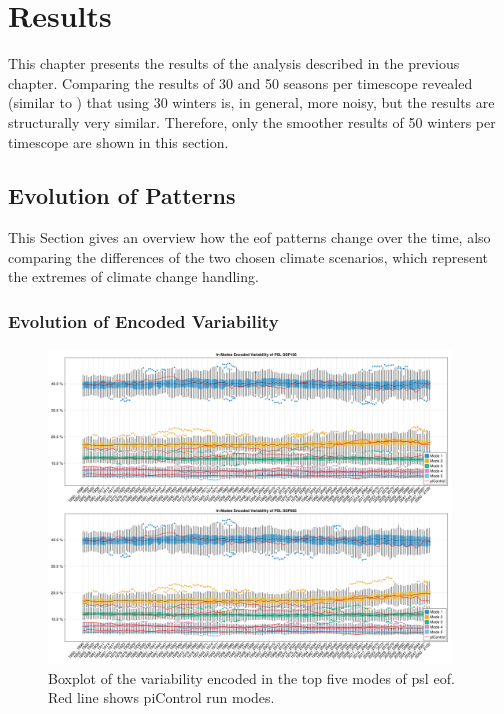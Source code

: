 
\chapter{Results}
\label{ch:results}

This chapter presents the results of the analysis described in the previous chapter. 
Comparing the results of 30 and 50 seasons per timescope revealed (similar to \cite{vietinghoff_visual_2021}) that using 30 winters is, in general, more noisy, but the results are structurally very similar. 
Therefore, only the smoother results of 50 winters per timescope are shown in this section. 

\section{Evolution of Patterns}
\label{sec:pattern evolution}

This Section gives an overview how the \ac{eof} patterns change over the time, also comparing the differences of the two chosen climate scenarios, which represent the extremes of climate change handling.   

\subsection{Evolution of Encoded Variability}
\label{sec:results encoded variance}


\begin{figure}[htb]
  \begin{center}
    \includegraphics[width=0.95\textwidth]{figures/mode_variability_psl_50seasons.png}
  \end{center}
  \caption[Explained Variability of PSL Modes]{Boxplot of the variability encoded in the top five modes of \ac{psl} \ac{eof}. Red line shows piControl run modes.}\label{fig:psl mode variability}
\end{figure}

